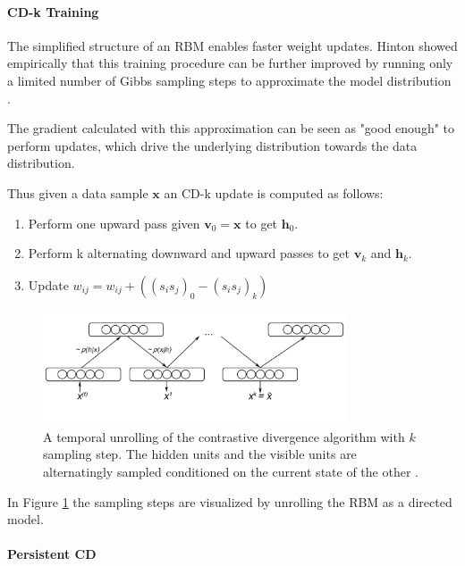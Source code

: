 \paragraph{CD-k Training}

The simplified structure of an RBM enables faster weight updates. 
Hinton showed empirically that this training procedure can be further improved by running only a limited number of Gibbs sampling steps to approximate the model distribution \cite{hinton2002training}.

The gradient calculated with this approximation can be seen as "good enough" to perform updates, which drive the underlying distribution towards the data distribution.

Thus given a data sample $\textbf{x}$ an CD-k update is computed as follows:
\begin{enumerate}
\item Perform one upward pass given $\textbf{v}_0=\textbf{x}$ to get $\textbf{h}_0$.
\item Perform k alternating downward and upward passes to get $\textbf{v}_k$ and $\textbf{h}_k$.
\item Update $w_{ij} = w_{ij} + ( (s_i s_j)_0 - (s_i s_j)_k ) $ 
\end{enumerate} 

\begin{figure}
	\centering
    	\includegraphics[width=0.8\textwidth]{imgs/cd.png} 
    \caption{A temporal unrolling of the contrastive divergence algorithm with $k$ sampling step. The hidden units and the visible units are alternatingly sampled conditioned on the current state of the other \cite{cdImg}.}
	\label{fig:cd}
\end{figure}

In Figure \ref{fig:cd} the sampling steps are visualized by unrolling the RBM as a directed model.

\paragraph{Persistent CD}

